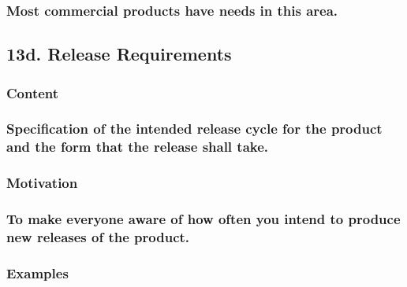 \documentclass[
]{article}
\begin{document}
\hypertarget{most-commercial-products-have-needs-in-this-area.}{%
\subsubsection{\texorpdfstring{Most commercial products have needs in
this area.
}{Most commercial products have needs in this area. }}\label{most-commercial-products-have-needs-in-this-area.}}

\hypertarget{d.-release-requirements}{%
\subsection{\texorpdfstring{13d. Release Requirements
}{13d. Release Requirements }}\label{d.-release-requirements}}

\hypertarget{content-48}{%
\subsubsection{Content}\label{content-48}}

\hypertarget{specification-of-the-intended-release-cycle-for-the-product-and-the-form-that-the-release-shall-take.}{%
\subsubsection{Specification of the intended release cycle for the
product and the form that the release shall
take.}\label{specification-of-the-intended-release-cycle-for-the-product-and-the-form-that-the-release-shall-take.}}

\hypertarget{motivation-47}{%
\subsubsection{Motivation}\label{motivation-47}}

\hypertarget{to-make-everyone-aware-of-how-often-you-intend-to-produce-new-releases-of-the-product.}{%
\subsubsection{To make everyone aware of how often you intend to produce
new releases of the
product.}\label{to-make-everyone-aware-of-how-often-you-intend-to-produce-new-releases-of-the-product.}}

\hypertarget{examples-32}{%
\subsubsection{Examples}\label{examples-32}}
\end{document}
